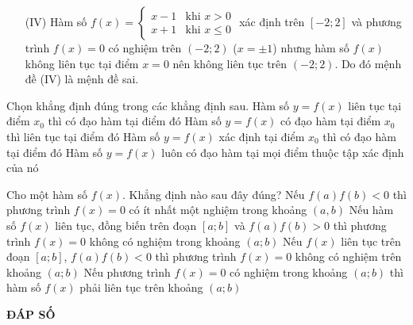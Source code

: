 \begin{ex}
{\begin{enumerate}
			\item[(IV)] Hàm số $f(x) = \begin{cases} x - 1 & \text{khi } x >0 \\ x + 1 & \text{khi } x \le 0 \end{cases}$ xác định trên $[-2;2]$ và phương trình $f(x) = 0$ có nghiệm trên $(-2;2)$ ($x = \pm 1$) nhưng hàm số $f(x)$ không liên tục tại điểm $ x = 0$ nên không liên tục trên $(-2;2)$. Do đó mệnh đề (IV) là mệnh đề sai.
		\end{enumerate}	
	}
\end{ex}


\begin{ex}%
	Chọn khẳng định đúng trong các khẳng định sau.
	\choice
	{Hàm số $ y=f(x) $ liên tục tại điểm $ x_0 $ thì có đạo hàm tại điểm đó}
	{\True Hàm số $ y=f(x) $ có đạo hàm tại điểm $ x_0 $ thì liên tục tại điểm đó}
	{Hàm số $ y=f(x) $ xác định tại điểm $ x_0 $ thì có đạo hàm tại điểm đó}
	{Hàm số $ y=f(x) $ luôn có đạo hàm tại mọi điểm thuộc tập xác định của nó}
\end{ex}



\begin{ex}%
	Cho một hàm số $f(x)$. Khẳng định nào sau đây đúng?
	\choice
	{Nếu $f(a)f(b)<0$ thì phương trình $f(x)=0$ có ít nhất một nghiệm trong khoảng $(a,b)$}
	{\True Nếu hàm số $f(x)$ liên tục, đồng biến trên đoạn $[a; b]$ và $f(a)f(b)>0$ thì phương trình $f(x)=0$ không có nghiệm trong khoảng $(a; b)$}
	{Nếu $f(x)$ liên tục trên đoạn $[a; b]$, $f(a)f(b)<0$ thì phương trình $f(x)=0$ không có nghiệm trên khoảng $(a; b)$}
	{Nếu phương trình $f(x)=0$ có nghiệm trong khoảng $(a; b)$ thì hàm số $f(x)$ phải liên tục trên khoảng $(a; b)$}
	
\end{ex}

\newpage 
\begin{center}
	\textbf{ĐÁP SỐ}
\end{center}
\begin{multicols}{10}
	\setlength{\columnseprule}{0pt}
	 
\end{multicols}
